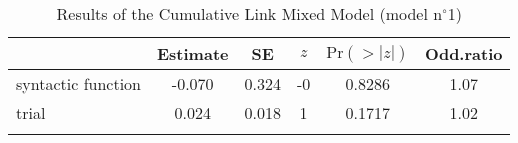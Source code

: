 \begin{table}
\begin{tabular}{l S[table-format=-1.3] S[table-format=1.3] S[table-format=1] S[table-format=1.4] S[table-format=1.2]}
  \lsptoprule
 & {Estimate} & {SE} & {$z$} & {$\text{Pr}(>|z|)$} & {Odd.ratio} \\ 
  \midrule
  syntactic function & -0.070 & 0.324 & -0 & 0.8286 & 1.07 \\ 
  trial              & 0.024 & 0.018 & 1 & 0.1717 & 1.02 \\ 
   \lspbottomrule
\end{tabular}
\caption{Results of the Cumulative Link Mixed Model (model n$^{\circ}$1)}
\label{tab:exp06-m1}
\end{table}
